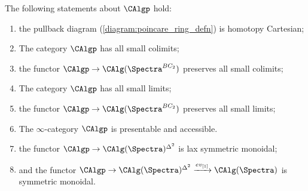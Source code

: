 \begin{theorem}
The following statements about $\CAlgp$ hold:
\begin{enumerate}[label=(\arabic*)]
\item \label{thmitem:defining_diagram_homotopy_pullback} the pullback diagram (\ref{diagram:poincare_ring_defn}) is homotopy Cartesian; %
\item \label{thmitem:poincare_ring_has_colimits} The category $\CAlgp$ has all small colimits;
\item \label{thmitem:poincare_ring_to_ring_preserves_colims} the functor $ \CAlgp \to \CAlg(\Spectra^{BC_2})$ preserves all small colimits;
\item \label{thmitem:poincare_ring_has_limits} The category $\CAlgp$ has all small limits;
\item \label{thmitem:poincare_ring_to_ring_preserves_lims} the functor $ \CAlgp \to \CAlg(\Spectra^{BC_2})$ preserves all small limits;
\item \label{thmitem:poincare_rings_presentable_accessible} The $ \infty $-category $ \CAlgp $ is presentable and accessible. 
\item the functor $ \CAlgp\to \CAlg(\Spectra)^{\Delta^2}$ is lax symmetric monoidal;
\item and the functor $ \CAlgp\to \CAlg(\Spectra)^{\Delta^2}\xrightarrow{ev_{[1]}} \CAlg(\Spectra)$ is symmetric monoidal.
\end{enumerate}
\end{theorem}

